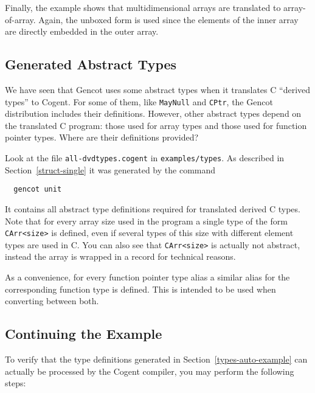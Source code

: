 \documentclass[a4paper]{report}
\newcommand{\code}[1]{\textnormal{\texttt{#1}}}
\begin{document}
Finally, the example shows that multidimensional arrays are translated to array-of-array. Again, the unboxed form is used
since the elements of the inner array are directly embedded in the outer array.

\subsection{Generated Abstract Types}
\label{types-auto-gen}

We have seen that Gencot uses some abstract types when it translates C ``derived types'' to Cogent. For some of them, like 
\code{MayNull} and \code{CPtr}, the Gencot distribution includes their definitions. However, other abstract types
depend on the translated C program: those used for array types and those used for function pointer types. Where
are their definitions provided?

Look at the file \code{all-dvdtypes.cogent} in \code{examples/types}. As described in Section~\ref{struct-single} it was 
generated by the command
\begin{verbatim}
  gencot unit
\end{verbatim}
It contains all abstract type definitions required for translated derived C types. Note that for every array
size used in the program a single type of the form \code{CArr<size>} is defined, even if several types of this
size with different element types are used in C. You can also see that \code{CArr<size>} is actually not abstract, 
instead the array is wrapped in a record for technical reasons.

As a convenience, for every function pointer type alias a similar alias for the corresponding function type is 
defined. This is intended to be used when converting between both.

\subsection{Continuing the Example}

To verify that the type definitions generated in Section~\ref{types-auto-example} can actually be processed by the 
Cogent compiler, you may perform the following steps:
\end{document}
